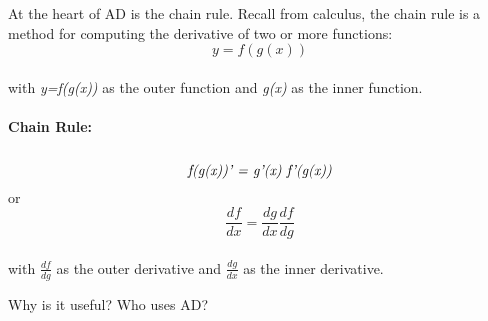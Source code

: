 \documentclass[oneside]{article}
\begin{document}
At the heart of AD is the chain rule. Recall from calculus, the chain rule is a method for computing the derivative of two or more functions:\\
 \begin{equation}
 y = f(g(x)) 
 \end{equation}
  \\
 with \textit{y=f(g(x))} as the outer function and \textit{g(x)} as the inner function. \\ 
 \\
 \textbf{Chain Rule:} \\ \\
  \begin{equation}
 \textit{f(g(x))' = g'(x) f'(g(x))} \\
 \end{equation}
 or \\
\begin{equation}
\frac{df}{dx} = \frac{dg}{dx}\frac{df}{dg}
\end{equation}
\\
with \textit{$\frac{df}{dg}$} as the outer derivative and \textit{$\frac{dg}{dx}$} as the inner derivative. \\

\begin{editnote}
Why is it useful?
Who uses AD?
\end{editnote}
                 
\end{document}
